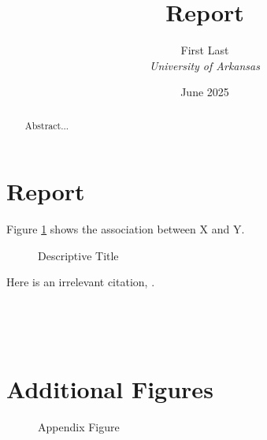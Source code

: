 \documentclass[12pt]{article}
\title{Report}
\author{First Last \\ \emph{University of Arkansas}}
\date{June 2025}
\begin{document}
\maketitle
\begin{abstract}
  Abstract...
\end{abstract}
\newpage


\section{Report}

Figure \ref{fig:short_description} shows the association between X and Y.

\begin{figure}[htb!]
  \caption{Descriptive Title}
  \label{fig:short_description}

\end{figure}



Here is an irrelevant citation, \citet{gentzkow2014code}.







\newpage~

\newpage~\appendix
{}
\setcounter{table}{0}
\setcounter{figure}{0}
\renewcommand{\thetable}{\thesection\arabic{table}}
\renewcommand{\thefigure}{\thesection\arabic{figure}}

\setcounter{equation}{0}

\section{Additional Figures}

\begin{figure}[htb!]
  \caption{Appendix Figure}
  \label{fig:appendix_1}

\end{figure}
\end{document}
